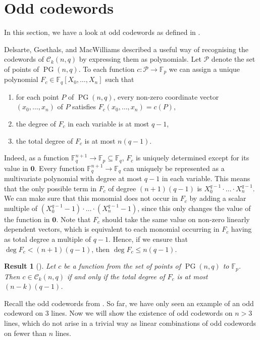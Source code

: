 \documentclass[12pt, a4paper]{article}
\newtheorem{res}[thm]{Result}
\theoremstyle{definition}
\newcommand{\FF}{\mathbb F}
\newcommand{\zero}{\mathbf 0}
\newcommand{\mc}{\mathcal C}
\renewcommand{\mp}{\mathcal P}
\DeclareMathOperator{\PG}{PG}
\newcommand{\pg}{\PG}
\begin{document}
\section{Odd codewords}
 \label{Sec:Concurrent}

In this section, we have a look at odd codewords as defined in .

Delsarte, Goethals, and MacWilliams \cite{delsartegoethalsmacwilliams} described a useful way of recognising the codewords of $\mc_k(n,q)$ by expressing them as polynomials.
Let $\mp$ denote the set of points of $\pg(n,q)$.
To each function $c: \mp \to \FF_p$ we can assign a unique polynomial $F_c \in \FF_q[X_0, \dots, X_n]$ such that
\begin{enumerate}
 \item for each point $P$ of $\pg(n,q)$, every non-zero coordinate vector $(x_0, \dots, x_n)$ of $P$ satisfies $F_c(x_0, \dots, x_n) = c(P)$,
 \item the degree of $F_c$ in each variable is at most $q-1$,
 \item the total degree of $F_c$ is at most $n(q-1)$.
\end{enumerate}
Indeed, as a function $\FF_q^{n+1} \to \FF_p \subseteq \FF_q$, $F_c$ is uniquely determined except for its value in $\zero$.
Every function $\FF_q^{n+1} \to \FF_q$ can uniquely be represented as a multivariate polynomial with degree at most $q-1$ in each variable.
This means that the only possible term in $F_c$ of degree $(n+1)(q-1)$ is $X_0^{q-1} \cdot \ldots \cdot X_n^{q-1}$.
We can make sure that this monomial does not occur in $F_c$ by adding a scalar multiple of $(X_0^{q-1}-1) \cdot \ldots \cdot (X_n^{q-1}-1)$, since this only changes the value of the function in $\zero$.
Note that $F_c$ should take the same value on non-zero linearly dependent vectors, which is equivalent to each monomial occurring in $F_c$ having as total degree a multiple of $q-1$.
Hence, if we ensure that $\deg F_c < (n+1)(q-1)$, then $\deg F_c \leq n(q-1)$.

\begin{res}[{\cite[Theorem 5.2.3]{delsartegoethalsmacwilliams}}]
 \label{Res:DGM}
 Let $c$ be a function from the set of points of $\pg(n,q)$ to $\FF_p$.
 Then $c \in \mc_k(n,q)$ if and only if the total degree of $F_c$ is at most $(n-k)(q-1)$.
\end{res}

Recall the odd codewords from .
So far, we have only seen an example of an odd codeword on 3 lines.
Now we will show the existence of odd codewords on $n > 3$ lines, which do not arise in a trivial way as linear combinations of odd codewords on fewer than $n$ lines.
\end{document}
